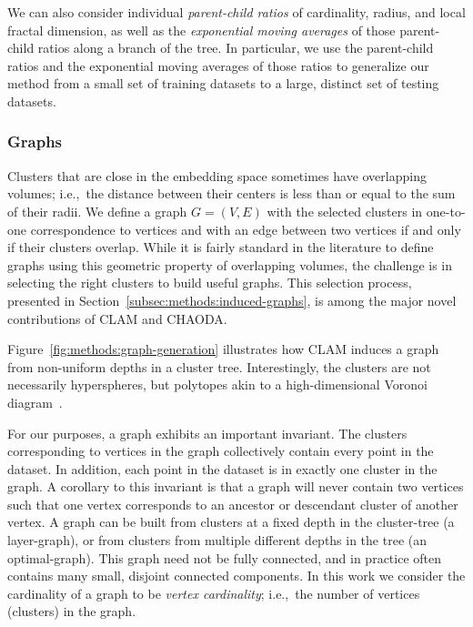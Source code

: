 We can also consider individual \textit{parent-child ratios} of cardinality, radius, and local fractal dimension, as well as the \textit{exponential moving averages} of those parent-child ratios along a branch of the tree.
In particular, we use the parent-child ratios and the exponential moving averages of those ratios to generalize our method from a small set of training datasets to a large, distinct set of testing datasets.


\subsubsection{Graphs}
\label{subsubsec:methods:clam:graphs}

Clusters that are close in the embedding space sometimes have overlapping volumes; i.e.,\ the distance between their centers is less than or equal to the sum of their radii.
We define a graph $G=(V,E)$ with the selected clusters in one-to-one correspondence to vertices and with an edge between two vertices if and only if their clusters overlap.
While it is fairly standard in the literature to define graphs using this geometric property of overlapping volumes, the challenge is in selecting the right clusters to build useful graphs.
This selection process, presented in Section~\ref{subsec:methods:induced-graphs}, is among the major novel contributions of CLAM and CHAODA.

Figure~\ref{fig:methods:graph-generation} illustrates how CLAM induces a graph from non-uniform depths in a cluster tree.
Interestingly, the clusters are not necessarily hyperspheres, but polytopes akin to a high-dimensional Voronoi diagram~\cite{voronoi1908nouvelles}.

For our purposes, a graph exhibits an important invariant.
The clusters corresponding to vertices in the graph collectively contain every point in the dataset.
In addition, each point in the dataset is in exactly one cluster in the graph.
A corollary to this invariant is that a graph will never contain two vertices such that one vertex corresponds to an ancestor or descendant cluster of another vertex.
A graph can be built from clusters at a fixed depth in the cluster-tree (a layer-graph), or from clusters from multiple different depths in the tree (an optimal-graph).
This graph need not be fully connected, and in practice often contains many small, disjoint connected components.
In this work we consider the cardinality of a graph to be \textit{vertex cardinality}; i.e.,\ the number of vertices (clusters) in the graph.


